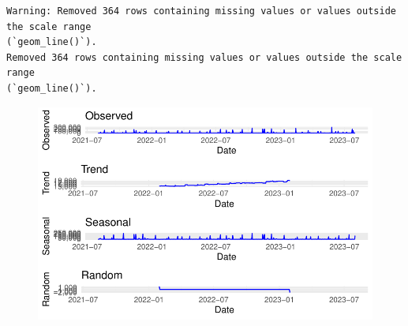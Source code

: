 \documentclass[
  letterpaper,
  DIV=11,
  numbers=noendperiod]{scrartcl}
\begin{document}
\begin{verbatim}
Warning: Removed 364 rows containing missing values or values outside the scale range
(`geom_line()`).
Removed 364 rows containing missing values or values outside the scale range
(`geom_line()`).
\end{verbatim}

\begin{figure}[H]

{\centering \includegraphics{Time-Serise-EDA_files/figure-pdf/unnamed-chunk-5-1.pdf}

}

\end{figure}
\end{document}
